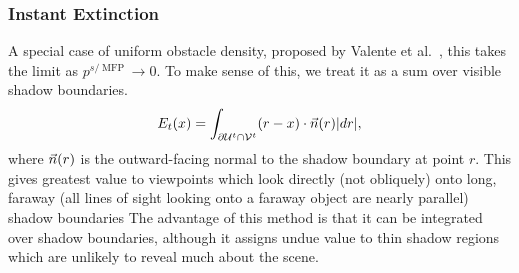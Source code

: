\subsubsection{Instant Extinction}
A special case of uniform obstacle density, proposed by Valente et al.\ \cite{valenteTS13},
this takes the limit as $p^{s/\operatorname{MFP}}\to0$.
To make sense of this, we treat it as a sum over visible shadow boundaries.
$$E_t(x) = \int_{\partial \mathcal{U}^t \cap \mathcal{V}^t} (r-x)\cdot \vec{n}(r) |dr|,$$
where $\vec{n}(r)$ is the outward-facing normal to the shadow boundary at point $r$.
This gives greatest value to viewpoints which look directly (not obliquely) onto long,
faraway (all lines of sight looking onto a faraway object are nearly parallel) shadow boundaries
The advantage of this method is that it can be integrated over shadow boundaries,
although it assigns undue value to thin shadow regions which are unlikely to reveal much about the scene.

